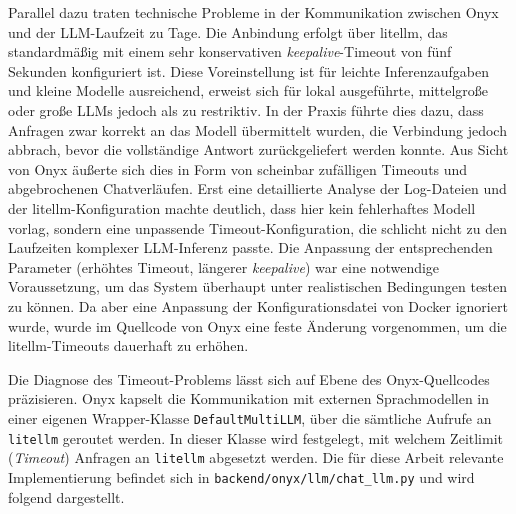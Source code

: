 Parallel dazu traten technische Probleme in der Kommunikation zwischen Onyx und der LLM-Laufzeit zu Tage.
Die Anbindung erfolgt über litellm, das standardmäßig mit einem sehr konservativen \textit{keepalive}-Timeout von fünf Sekunden konfiguriert ist.
Diese Voreinstellung ist für leichte Inferenzaufgaben und kleine Modelle ausreichend, erweist sich für lokal ausgeführte, mittelgroße oder große LLMs jedoch als zu restriktiv.
In der Praxis führte dies dazu, dass Anfragen zwar korrekt an das Modell übermittelt wurden, die Verbindung jedoch abbrach, bevor die vollständige Antwort zurückgeliefert werden konnte.
Aus Sicht von Onyx äußerte sich dies in Form von scheinbar zufälligen Timeouts und abgebrochenen Chatverläufen.
Erst eine detaillierte Analyse der Log-Dateien und der litellm-Konfiguration machte deutlich, dass hier kein fehlerhaftes Modell vorlag, sondern eine unpassende Timeout-Konfiguration, die schlicht nicht zu den Laufzeiten komplexer LLM-Inferenz passte.
Die Anpassung der entsprechenden Parameter (erhöhtes Timeout, längerer \textit{keepalive}) war eine notwendige Voraussetzung, um das System überhaupt unter realistischen Bedingungen testen zu können.
Da aber eine Anpassung der Konfigurationsdatei von Docker ignoriert wurde, wurde im Quellcode von Onyx eine feste Änderung vorgenommen, um die litellm-Timeouts dauerhaft zu erhöhen.

Die Diagnose des Timeout-Problems lässt sich auf Ebene des Onyx-Quellcodes präzisieren.
Onyx kapselt die Kommunikation mit externen Sprachmodellen in einer eigenen Wrapper-Klasse \texttt{DefaultMultiLLM}, über die sämtliche Aufrufe an \texttt{litellm} geroutet werden.
In dieser Klasse wird festgelegt, mit welchem Zeitlimit (\emph{Timeout}) Anfragen an \texttt{litellm} abgesetzt werden.
Die für diese Arbeit relevante Implementierung befindet sich in \texttt{backend/onyx/llm/chat\_llm.py} und wird folgend dargestellt.

